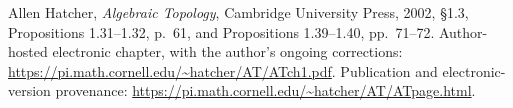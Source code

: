 Allen Hatcher, \emph{Algebraic Topology}, Cambridge University Press,
2002, \S1.3, Propositions 1.31--1.32, p.~61, and
Propositions 1.39--1.40, pp.~71--72.
Author-hosted electronic chapter, with the author's ongoing corrections:
\url{https://pi.math.cornell.edu/~hatcher/AT/ATch1.pdf}.
Publication and electronic-version provenance:
\url{https://pi.math.cornell.edu/~hatcher/AT/ATpage.html}.
